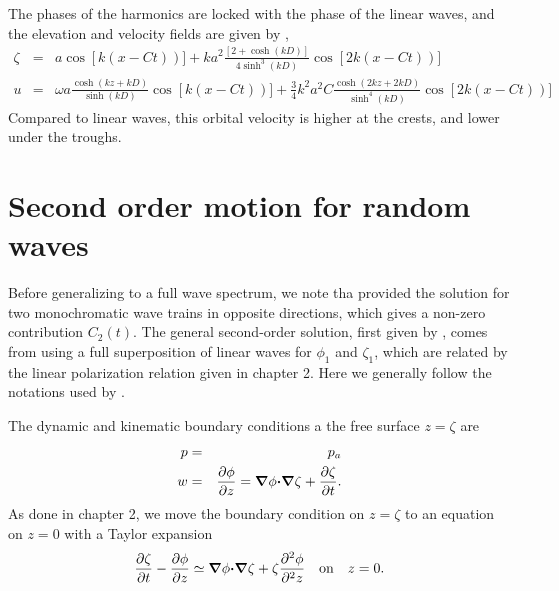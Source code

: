 The phases of the harmonics are locked with the phase of the linear waves, and the elevation and velocity 
fields are given by \citep{Dean&Dalrymple1991},
\begin{eqnarray}
    \zeta&=&a \cos \left[k\left(x- C t\right) \right)]
    + ka^2 \frac{\left[2+\cosh\left(kD\right)\right]}
        {4 \sinh^3\left(kD\right)} \cos \left[2k\left(x- C t\right) \right)]\\
    u&=&\omega a \frac{\cosh\left(kz+kD\right)}{\sinh\left(kD\right)}
        \cos \left[k\left(x- C t\right) \right)]
    + \frac{3}{4} k^2 a^2 C \frac{\cosh\left(2kz+2kD\right)}
        {\sinh^4\left(kD\right)}    \cos \left[2k\left(x- C t\right) \right)]
\end{eqnarray}
Compared to linear waves, this orbital velocity is higher at the crests, and lower 
under the troughs. 




\section{Second order motion for random waves}
Before generalizing to a full wave spectrum, we note tha \cite{Miche1944b} provided the solution for two monochromatic wave 
trains in opposite directions, which gives a non-zero contribution $C_2(t)$. 
The general second-order solution, first given by \cite{Biesel1952}, comes from using a full superposition of linear waves for 
$\phi_1$ and $\zeta_1$, which are related by  the linear polarization relation given in chapter 2. Here we generally follow the notations 
used by  \cite{Hasselmann1962}.

The dynamic and kinematic  boundary conditions a the free surface  $z=\zeta$ are 
\begin{eqnarray}
    p&=&p_a \\
      w&=&\frac{\partial \phi }{\partial z}= \mbox{\boldmath $\nabla$} {\mathbf \phi}\mbox{\boldmath $\cdot$}\mbox{\boldmath $\nabla$} \zeta
    + \frac{\partial \zeta }{\partial t}.
\end{eqnarray}
As done in chapter 2, we move the boundary condition on $z=\zeta$ to an equation  on $z=0$ with a Taylor expansion 
\begin{equation}
     \frac{\partial \zeta }{\partial t} -  \frac{\partial \phi }{\partial z} \simeq 
\mbox{\boldmath $\nabla$} {\mathbf \phi}\mbox{\boldmath $\cdot$}\mbox{\boldmath $\nabla$} \zeta    + \zeta \frac{\partial^2 \phi }{\partial^2 z} \quad \mathrm{on} \quad z=0. \label{surf_kine_Taylor}
\end{equation}

